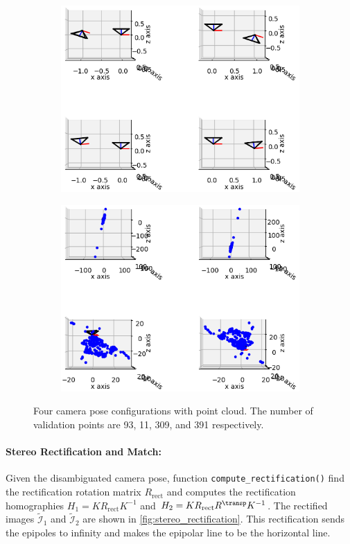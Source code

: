 \documentclass[11pt]{scrartcl}
\begin{document}
\begin{figure}[ht!]
\centering
\begin{subfigure}{.5\textwidth}
	\centering
	\includegraphics[width=.75\linewidth]{camera_poses.png}
\end{subfigure}%
\begin{subfigure}{.5\textwidth}
	\centering
	\includegraphics[width=.75\linewidth]{triangulation_93_309_11_391.png}
\end{subfigure}
\caption{Four camera pose configurations with point cloud. The number of validation points are 93, 11, 309, and 391 respectively.}
\label{fig:camera}
\end{figure}

\paragraph{Stereo Rectification and Match:}
Given the disambiguated camera pose, function \texttt{compute\_rectification()} find the rectification rotation matrix $R_\text{rect}$ and computes the rectification homographies $H_1=KR_\text{rect} K^{-1}$ and $H_2=KR_\text{rect} R^\transp K^{-1}$. The rectified images $\tilde{\mathcal{I}}_1$ and $\tilde{\mathcal{I}}_2$ are shown in \autoref{fig:stereo_rectification}. This rectification sends the epipoles to infinity and makes the epipolar line to be the horizontal line.
\end{document}

